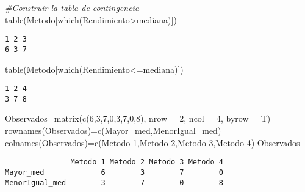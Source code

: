 \documentclass[
  a4paper,
  oneside,
  openany]{book}
\newenvironment{Shaded}{\begin{snugshade}}{\end{snugshade}}
\newcommand{\AttributeTok}[1]{\textcolor[rgb]{0.77,0.63,0.00}{#1}}
\newcommand{\CommentTok}[1]{\textcolor[rgb]{0.56,0.35,0.01}{\textit{#1}}}
\newcommand{\DecValTok}[1]{\textcolor[rgb]{0.00,0.00,0.81}{#1}}
\newcommand{\FunctionTok}[1]{\textcolor[rgb]{0.00,0.00,0.00}{#1}}
\newcommand{\NormalTok}[1]{#1}
\newcommand{\OtherTok}[1]{\textcolor[rgb]{0.56,0.35,0.01}{#1}}
\newcommand{\SpecialCharTok}[1]{\textcolor[rgb]{0.00,0.00,0.00}{#1}}
\newcommand{\StringTok}[1]{\textcolor[rgb]{0.31,0.60,0.02}{#1}}
\begin{document}
\begin{Shaded}
\begin{Highlighting}[]
\CommentTok{\#Construir la tabla de contingencia}
\FunctionTok{table}\NormalTok{(Metodo[}\FunctionTok{which}\NormalTok{(Rendimiento}\SpecialCharTok{\textgreater{}}\NormalTok{mediana)])}
\end{Highlighting}
\end{Shaded}

\begin{verbatim}
1 2 3 
6 3 7 
\end{verbatim}

\begin{Shaded}
\begin{Highlighting}[]
\FunctionTok{table}\NormalTok{(Metodo[}\FunctionTok{which}\NormalTok{(Rendimiento}\SpecialCharTok{\textless{}=}\NormalTok{mediana)])}
\end{Highlighting}
\end{Shaded}

\begin{verbatim}
1 2 4 
3 7 8 
\end{verbatim}

\begin{Shaded}
\begin{Highlighting}[]
\NormalTok{Observados}\OtherTok{=}\FunctionTok{matrix}\NormalTok{(}\FunctionTok{c}\NormalTok{(}\DecValTok{6}\NormalTok{,}\DecValTok{3}\NormalTok{,}\DecValTok{7}\NormalTok{,}\DecValTok{0}\NormalTok{,}\DecValTok{3}\NormalTok{,}\DecValTok{7}\NormalTok{,}\DecValTok{0}\NormalTok{,}\DecValTok{8}\NormalTok{), }\AttributeTok{nrow =} \DecValTok{2}\NormalTok{, }\AttributeTok{ncol =} \DecValTok{4}\NormalTok{, }\AttributeTok{byrow =}\NormalTok{ T)}
\FunctionTok{rownames}\NormalTok{(Observados)}\OtherTok{=}\FunctionTok{c}\NormalTok{(}\StringTok{\textquotesingle{}Mayor\_med\textquotesingle{}}\NormalTok{,}\StringTok{\textquotesingle{}MenorIgual\_med\textquotesingle{}}\NormalTok{)}
\FunctionTok{colnames}\NormalTok{(Observados)}\OtherTok{=}\FunctionTok{c}\NormalTok{(}\StringTok{\textquotesingle{}Metodo 1\textquotesingle{}}\NormalTok{,}\StringTok{\textquotesingle{}Metodo 2\textquotesingle{}}\NormalTok{,}\StringTok{\textquotesingle{}Metodo 3\textquotesingle{}}\NormalTok{,}\StringTok{\textquotesingle{}Metodo 4\textquotesingle{}}\NormalTok{)}
\NormalTok{Observados}
\end{Highlighting}
\end{Shaded}

\begin{verbatim}
               Metodo 1 Metodo 2 Metodo 3 Metodo 4
Mayor_med             6        3        7        0
MenorIgual_med        3        7        0        8
\end{verbatim}
\end{document}
